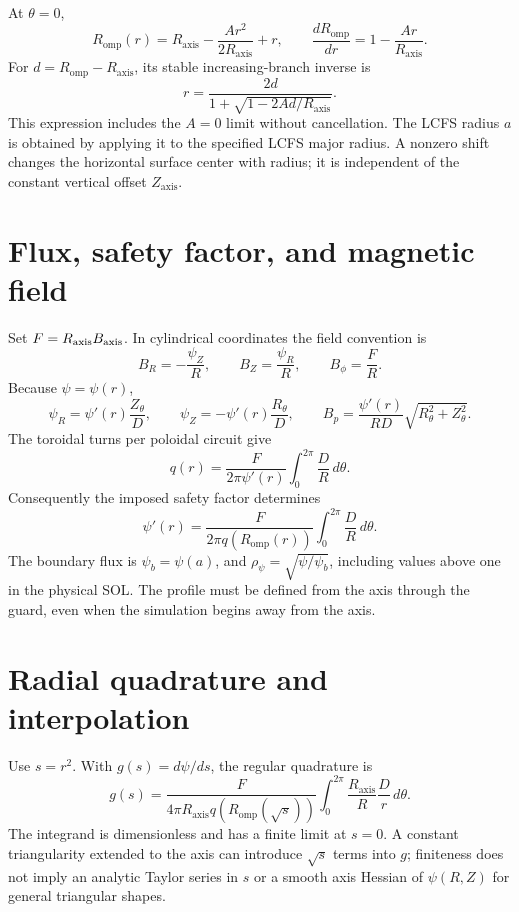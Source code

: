 \documentclass[11pt]{article}
\newcommand{\Ra}{R_{\mathrm{axis}}}
\newcommand{\Za}{Z_{\mathrm{axis}}}
\newcommand{\Romp}{R_{\mathrm{omp}}}
\begin{document}
At $\theta=0$,
\begin{equation}
\Romp(r)=\Ra-\frac{Ar^2}{2\Ra}+r,\qquad
\frac{d\Romp}{dr}=1-\frac{Ar}{\Ra}.
\end{equation}
For $d=\Romp-\Ra$, its stable increasing-branch inverse is
\begin{equation}
r=\frac{2d}{1+\sqrt{1-2Ad/\Ra}}.
\end{equation}
This expression includes the $A=0$ limit without cancellation. The LCFS
radius $a$ is obtained by applying it to the specified LCFS major radius.
A nonzero shift changes the horizontal surface center with radius; it is
independent of the constant vertical offset $\Za$.

\section{Flux, safety factor, and magnetic field}
Set $F=\Ra B_{\rm axis}$. In cylindrical coordinates the field convention is
\begin{equation}
B_R=-\frac{\psi_Z}{R},\qquad B_Z=\frac{\psi_R}{R},\qquad B_\phi=\frac{F}{R}.
\end{equation}
Because $\psi=\psi(r)$,
\begin{equation}
\psi_R=\psi'(r)\frac{Z_\theta}{D},\qquad
\psi_Z=-\psi'(r)\frac{R_\theta}{D},\qquad
B_p=\frac{\psi'(r)}{RD}\sqrt{R_\theta^2+Z_\theta^2}.
\end{equation}
The toroidal turns per poloidal circuit give
\begin{equation}
q(r)=\frac{F}{2\pi\psi'(r)}\int_0^{2\pi}\frac{D}{R}\,d\theta.
\end{equation}
Consequently the imposed safety factor determines
\begin{equation}
\psi'(r)=\frac{F}{2\pi q(\Romp(r))}
\int_0^{2\pi}\frac{D}{R}\,d\theta.
\end{equation}
The boundary flux is $\psi_b=\psi(a)$, and
$\rho_\psi=\sqrt{\psi/\psi_b}$, including values above one in the physical SOL.
The profile must be defined from the axis through the guard, even when the
simulation begins away from the axis.

\section{Radial quadrature and interpolation}
Use $s=r^2$. With $g(s)=d\psi/ds$, the regular quadrature is
\begin{equation}
g(s)=\frac{F}{4\pi\Ra q(\Romp(\sqrt{s}))}
\int_0^{2\pi}\frac{\Ra}{R}\frac{D}{r}\,d\theta.
\end{equation}
The integrand is dimensionless and has a finite limit at $s=0$. A constant
triangularity extended to the axis can introduce $\sqrt{s}$ terms into $g$;
finiteness does not imply an analytic Taylor series in $s$ or a smooth axis
Hessian of $\psi(R,Z)$ for general triangular shapes.
\end{document}
